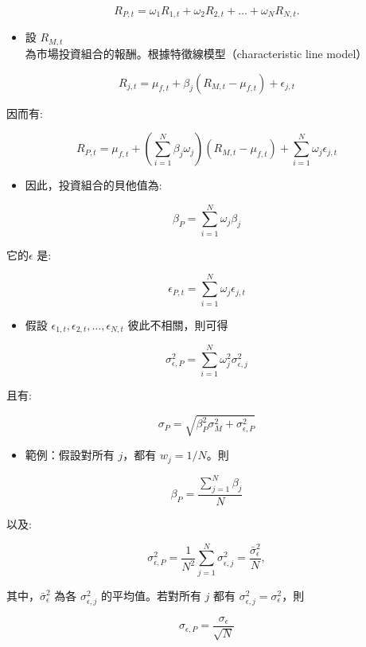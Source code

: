 \documentclass[letterpaper]{article}
\begin{document}
$$
R_{P, t}=\omega_{1} R_{1, t}+\omega_{2} R_{2, t}+\ldots+\omega_{N} R_{N, t} .
$$

\begin{itemize}
	\item 設 $R_{M, t}$ 為市場投資組合的報酬。根據特徵線模型（characteristic line model）
\end{itemize}


$$
R_{j, t}=\mu_{f, t}+\beta_{j}\left(R_{M, t}-\mu_{f, t}\right)+\epsilon_{j, t}
$$

因而有:

$$
R_{P, t}=\mu_{f, t}+\left(\sum_{i=1}^{N} \beta_{j} \omega_{j}\right)\left(R_{M, t}-\mu_{f, t}\right)+\sum_{i=1}^{N} \omega_{j} \epsilon_{j, t}
$$

\begin{itemize}
	\item 因此，投資組合的貝他值為:
\end{itemize}


$$
\beta_{P}=\sum_{i=1}^{N} \omega_{j} \beta_{j}
$$

它的$\epsilon$ 是:

$$
\epsilon_{P, t}=\sum_{i=1}^{N} \omega_{j} \epsilon_{j, t}
$$

\begin{itemize}
	\item 假設 $\epsilon_{1, t}, \epsilon_{2, t}, \ldots, \epsilon_{N, t}$ 彼此不相關，則可得
\end{itemize}


$$
\sigma_{\epsilon, P}^{2}=\sum_{i=1}^{N} \omega_{j}^{2} \sigma_{\epsilon, j}^{2}
$$

且有:

$$
\sigma_{P}=\sqrt{\beta_{P}^{2} \sigma_{M}^{2}+\sigma_{\epsilon, P}^{2}}
$$


\begin{itemize}
	\item 範例：假設對所有 $j$，都有 $w_{j} = 1 / N$。則
\end{itemize}

$$
\beta_{P}=\frac{\sum_{j=1}^{N} \beta_{j}}{N}
$$

以及:

$$
\sigma_{\epsilon, P}^{2}=\frac{1}{N^{2}} \sum_{j=1}^{N} \sigma_{\epsilon, j}^{2}=\frac{\bar{\sigma}_{\epsilon}^{2}}{N},
$$

其中，$\bar{\sigma}_{\epsilon}^{2}$ 為各 $\sigma_{\epsilon, j}^{2}$ 的平均值。若對所有 $j$ 都有 $\sigma_{\epsilon, j}^{2} = \sigma_{\epsilon}^{2}$，則


$$
\sigma_{\epsilon, P}=\frac{\sigma_{\epsilon}}{\sqrt{N}}
$$
\end{document}
